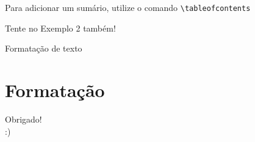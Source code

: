 \documentclass[12pt]{beamer}
\begin{document}
\begin{frame}[fragile]
  Para adicionar um sumário, utilize o comando \verb+\tableofcontents+
  \bigskip

  Tente no Exemplo 2 também!
\end{frame}

\begin{frame}{Formatação de texto}
  \section{Formatação}
\end{frame}

\begin{frame}
  \begin{center}
    \large Obrigado!\\
    :)
  \end{center}
\end{frame}
\end{document}
